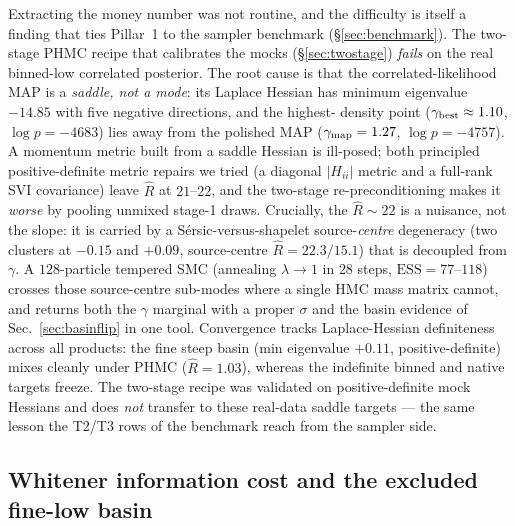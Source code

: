 \documentclass[11pt,letterpaper]{article}
\newcommand{\gammaEPL}{\ensuremath{\gamma}}
\newcommand{\Rhat}{\ensuremath{\hat{R}}}
\newcommand{\ESS}{\textrm{ESS}}
\begin{document}
Extracting the money number was not routine, and the difficulty is itself a
finding that ties Pillar~1 to the sampler benchmark (\S\ref{sec:benchmark}).
The two-stage PHMC recipe that calibrates the mocks (\S\ref{sec:twostage}) {\it
fails} on the real binned-low correlated posterior. The root cause is that the
correlated-likelihood MAP is a {\it saddle, not a mode}: its Laplace Hessian has
minimum eigenvalue $-14.85$ with five negative directions, and the highest-
density point ($\gammaEPL_{\rm best}\approx1.10$, $\log p=-4683$) lies away from
the polished MAP ($\gammaEPL_{\rm map}=1.27$, $\log p=-4757$). A momentum metric
built from a saddle Hessian is ill-posed; both principled positive-definite
metric repairs we tried (a diagonal $|H_{ii}|$ metric and a full-rank SVI
covariance) leave $\Rhat$ at $21$--$22$, and the two-stage re-preconditioning
makes it {\it worse} by pooling unmixed stage-1 draws. Crucially, the
$\Rhat\!\sim\!22$ is a nuisance, not the slope: it is carried by a
S\'ersic-versus-shapelet source-{\it centre} degeneracy (two clusters at
$-0.15$ and $+0.09$, source-centre $\Rhat=22.3/15.1$) that is decoupled from
$\gammaEPL$. A $128$-particle tempered SMC (annealing $\lambda\!\to\!1$ in $28$
steps, $\ESS=77$--$118$) crosses those source-centre sub-modes where a single
HMC mass matrix cannot, and returns both the $\gammaEPL$ marginal with a proper
$\sigma$ and the basin evidence of Sec.~\ref{sec:basinflip} in one tool.
Convergence tracks Laplace-Hessian definiteness across all products: the fine
steep basin (min eigenvalue $+0.11$, positive-definite) mixes cleanly under
PHMC ($\Rhat=1.03$), whereas the indefinite binned and native targets freeze.
The two-stage recipe was validated on positive-definite mock Hessians and does
{\it not} transfer to these real-data saddle targets --- the same lesson the
T2/T3 rows of the benchmark reach from the sampler side.

\subsection{Whitener information cost and the excluded fine-low basin}
\end{document}
